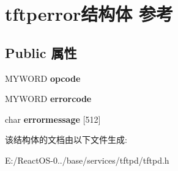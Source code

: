 \hypertarget{structtftperror}{}\section{tftperror结构体 参考}
\label{structtftperror}
\subsection*{Public 属性}
\begin{DoxyCompactItemize}
\item 
\mbox{\label{structtftperror_a93633c5626ee29c61f67a4096e2f7cc5}} 
M\+Y\+W\+O\+RD {\bfseries opcode}
\item 
\mbox{\label{structtftperror_abef6960a078cd6e679d9b5dcbbb86b8d}} 
M\+Y\+W\+O\+RD {\bfseries errorcode}
\item 
\mbox{\label{structtftperror_ae8c0f8a4b64562a976a9a6e0db4d0817}} 
char {\bfseries errormessage} \mbox{[}512\mbox{]}
\end{DoxyCompactItemize}


该结构体的文档由以下文件生成\+:\begin{DoxyCompactItemize}
\item 
E\+:/\+React\+O\+S-\/0../base/services/tftpd/tftpd.\+h\end{DoxyCompactItemize}
